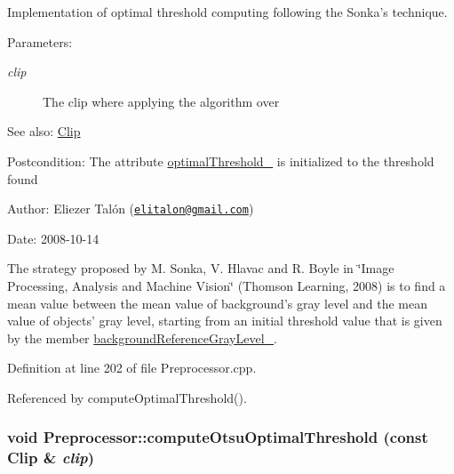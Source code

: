 Implementation of optimal threshold computing following the Sonka's technique. 

\begin{Desc}
\item[Parameters:]
\begin{description}
\item[{\em clip}]The clip where applying the algorithm over\end{description}
\end{Desc}
\begin{Desc}
\item[See also:]\hyperlink{class_clip}{Clip}\end{Desc}
\begin{Desc}
\item[Postcondition:]The attribute \hyperlink{class_preprocessor_865b1e28dd9535b96f70727a550104fe}{optimalThreshold\_\-} is initialized to the threshold found\end{Desc}
\begin{Desc}
\item[Author:]Eliezer Talón (\href{mailto:elitalon@gmail.com}{\tt elitalon@gmail.com}) \end{Desc}
\begin{Desc}
\item[Date:]2008-10-14\end{Desc}
The strategy proposed by M. Sonka, V. Hlavac and R. Boyle in \char`\"{}Image Processing, Analysis and Machine Vision\char`\"{} (Thomson Learning, 2008) is to find a mean value between the mean value of background's gray level and the mean value of objects' gray level, starting from an initial threshold value that is given by the member \hyperlink{class_preprocessor_2c9e44ff6522b2ce35d6bc6161ad2680}{backgroundReferenceGrayLevel\_\-}. 

Definition at line 202 of file Preprocessor.cpp.

Referenced by computeOptimalThreshold().\hypertarget{class_preprocessor_faa4368f471a3e5d0cb46865a2a1ccb7}{
\subsubsection[computeOtsuOptimalThreshold]{\setlength{\rightskip}{0pt plus 5cm}void Preprocessor::computeOtsuOptimalThreshold (const {\bf Clip} \& {\em clip})}}
\label{class_preprocessor_faa4368f471a3e5d0cb46865a2a1ccb7}


